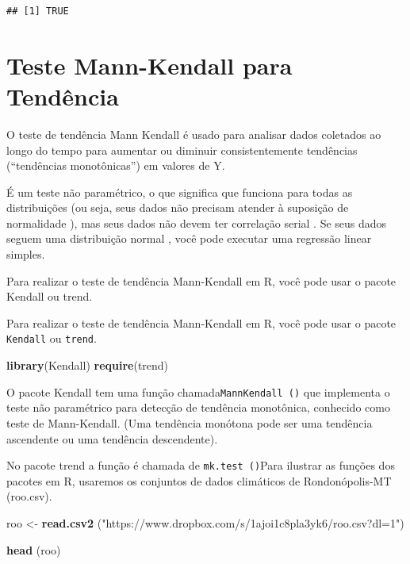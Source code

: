 \documentclass[
]{book}
\newenvironment{Shaded}{\begin{snugshade}}{\end{snugshade}}
\newcommand{\KeywordTok}[1]{\textcolor[rgb]{0.13,0.29,0.53}{\textbf{#1}}}
\newcommand{\NormalTok}[1]{#1}
\newcommand{\StringTok}[1]{\textcolor[rgb]{0.31,0.60,0.02}{#1}}
\begin{document}
\begin{verbatim}
## [1] TRUE
\end{verbatim}

\hypertarget{teste-mann-kendall-para-tenduxeancia}{%
\section{Teste Mann-Kendall para Tendência}\label{teste-mann-kendall-para-tenduxeancia}}

O teste de tendência Mann Kendall é usado para analisar dados coletados ao longo do tempo para aumentar ou diminuir consistentemente tendências (``tendências monotônicas'') em valores de Y.

É um teste não paramétrico, o que significa que funciona para todas as distribuições (ou seja, seus dados não precisam atender à suposição de normalidade ), mas seus dados não devem ter correlação serial . Se seus dados seguem uma distribuição normal , você pode executar uma regressão linear simples.

Para realizar o teste de tendência Mann-Kendall em R, você pode usar o pacote Kendall ou trend.

Para realizar o teste de tendência Mann-Kendall em R, você pode usar o pacote \texttt{Kendall} ou \texttt{trend}.

\begin{Shaded}
\begin{Highlighting}[]
\KeywordTok{library}\NormalTok{(Kendall)}
\KeywordTok{require}\NormalTok{(trend)}
\end{Highlighting}
\end{Shaded}

O pacote Kendall tem uma função chamada\texttt{MannKendall\ ()} que implementa o teste não paramétrico para detecção de tendência monotônica, conhecido como teste de Mann-Kendall. (Uma tendência monótona pode ser uma tendência ascendente ou uma tendência descendente).

No pacote trend a função é chamada de \texttt{mk.test\ ()}Para ilustrar as funções dos pacotes em R, usaremos os conjuntos de dados climáticos de Rondonópolis-MT (roo.csv).

\begin{Shaded}
\begin{Highlighting}[]
\NormalTok{roo <-}\StringTok{ }\KeywordTok{read.csv2}\NormalTok{ (}\StringTok{"https://www.dropbox.com/s/1ajoi1c8pla3yk6/roo.csv?dl=1"}\NormalTok{)}

\KeywordTok{head}\NormalTok{ (roo)}
\end{Highlighting}
\end{Shaded}
\end{document}
